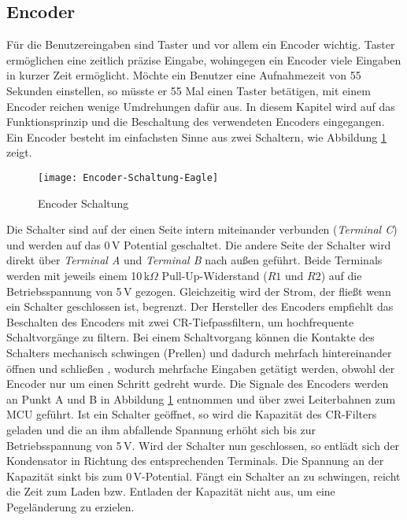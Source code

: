 
\subsection{Encoder}
\label{sec:Encoder}
Für die Benutzereingaben sind Taster und vor allem ein Encoder wichtig. Taster ermöglichen eine zeitlich präzise Eingabe, wohingegen ein Encoder viele Eingaben in kurzer Zeit ermöglicht. Möchte ein Benutzer eine Aufnahmezeit von 55 Sekunden einstellen, so müsste er 55 Mal einen Taster betätigen, mit einem Encoder reichen wenige Umdrehungen dafür aus. In diesem Kapitel wird auf das Funktionsprinzip und die Beschaltung des verwendeten Encoders eingegangen.\\
Ein Encoder besteht im einfachsten Sinne aus zwei Schaltern, wie Abbildung \ref{fig:Encoder-Schaltung} zeigt. 
\begin{figure}[h]
	\begin{center}
		\texttt{[image: Encoder-Schaltung-Eagle]}
		\caption{Encoder Schaltung \cite{EncoderMN}}
		\label{fig:Encoder-Schaltung}
	\end{center}
\end{figure}
Die Schalter sind auf der einen Seite intern miteinander verbunden (\textit{Terminal C}) und werden auf das 0\,V Potential geschaltet. Die andere Seite der Schalter wird direkt über \textit{Terminal A} und \textit{Terminal B} nach außen geführt. 
Beide Terminals werden mit jeweils einem 10\,k$\Omega$ Pull-Up-Widerstand ($R1$ und $R2$) auf die Betriebsspannung von 5\,V gezogen. Gleichzeitig wird der Strom, der fließt wenn ein Schalter geschlossen ist, begrenzt. Der Hersteller des Encoders empfiehlt das Beschalten des Encoders mit zwei CR-Tiefpassfiltern, um hochfrequente Schaltvorgänge zu filtern. Bei einem Schaltvorgang können die Kontakte des Schalters mechanisch schwingen (Prellen) und dadurch mehrfach hintereinander öffnen und schließen \cite[S. 67]{TechInfo}, wodurch mehrfache Eingaben getätigt werden, obwohl der Encoder nur um einen Schritt gedreht wurde. Die Signale des Encoders werden an Punkt A und B in Abbildung \ref{fig:Encoder-Schaltung} entnommen und über zwei Leiterbahnen zum MCU geführt. Ist ein Schalter geöffnet, so wird die Kapazität des CR-Filters geladen und die an ihm abfallende Spannung erhöht sich bis zur Betriebsspannung von 5\,V. Wird der Schalter nun geschlossen, so entlädt sich der Kondensator in Richtung des entsprechenden Terminals. Die Spannung an der Kapazität sinkt bis zum 0\,V-Potential. Fängt ein Schalter an zu schwingen, reicht die Zeit zum Laden bzw. Entladen der Kapazität nicht aus, um eine Pegeländerung zu erzielen. 
